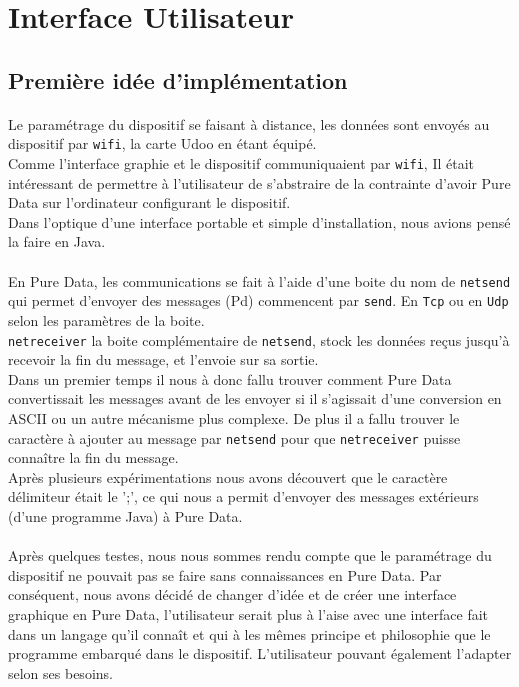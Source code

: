 \documentclass[a4paper, titlepage, oneside, 12pt]{article}%
\begin{document}
\section{Interface Utilisateur}
\subsection{Première idée d’implémentation}
\paragraph{}
Le paramétrage du dispositif se faisant à distance, les données sont envoyés au dispositif par \texttt{wifi}, la carte Udoo en étant équipé.\\
Comme l'interface graphie et le dispositif communiquaient par \texttt{wifi}, Il était intéressant de permettre à l'utilisateur de s'abstraire de la contrainte d'avoir Pure Data sur l'ordinateur configurant le dispositif. \\
Dans l'optique d'une interface portable et simple d'installation, nous avions pensé la faire en Java.
\paragraph{}
En Pure Data, les communications se fait à l'aide d'une boite du nom de \texttt{netsend} qui permet d'envoyer des messages (Pd) commencent par \texttt{send}. En \texttt{Tcp} ou en \texttt{Udp} selon les paramètres de la boite.\\
\texttt{netreceiver} la boite complémentaire de \texttt{netsend}, stock les données reçus jusqu’à recevoir la fin du message, et l'envoie sur sa sortie.\\
Dans un premier temps il nous à donc fallu trouver comment Pure Data convertissait les messages avant de les envoyer si il s’agissait d'une conversion en ASCII ou un autre  mécanisme plus complexe. De plus il a fallu trouver le caractère à ajouter au message par \texttt{netsend} pour que \texttt{netreceiver} puisse connaître la fin du message.\\
Après plusieurs expérimentations nous avons découvert que le caractère délimiteur était  le ';', ce qui nous a permit d'envoyer des messages extérieurs (d'une programme Java) à Pure Data.

\paragraph{}
Après quelques testes, nous nous sommes rendu compte que le paramétrage du dispositif ne pouvait pas se faire sans connaissances en Pure Data. Par conséquent, nous avons décidé de changer d'idée et de créer une interface graphique en Pure Data, l'utilisateur serait plus à l'aise avec une interface fait dans un langage qu'il connaît et qui à les mêmes principe et philosophie que le programme embarqué dans le dispositif. L'utilisateur pouvant également l’adapter selon ses besoins.
\end{document}
